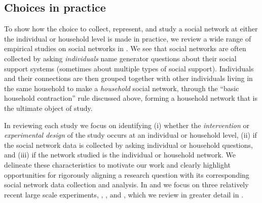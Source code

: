 \subsection{Choices in practice} \label{subsubsec:emp_choice}
To show how the choice to collect, represent, and study a social network at either the individual or household level is made in practice, we review a wide range of empirical studies on social networks in . We see that social networks are often collected by asking \textit{individuals} name generator questions about their social support systems (sometimes about multiple types of social support). Individuals and their connections are then grouped together with other individuals living in the same household to make a \textit{household} social network, through the ``basic household contraction'' rule discussed above, forming a household network that is the ultimate object of study. 

In reviewing each study we focus on identifying (i) whether the \textit{intervention} or \textit{experimental design} of the study occurs at an individual or household level, (ii) if the social network data is collected by asking individual or household questions, and (iii) if the network studied is the individual or household network. We delineate these characteristics to motivate our work and clearly highlight opportunities for rigorously aligning a research question with its corresponding social network data collection and analysis. In  and  we focus on three relatively recent large scale experiments, \cite{banerjee2013}, \cite{banerjee2019}, and \cite{airoldi2024}, which we review in greater detail in .




